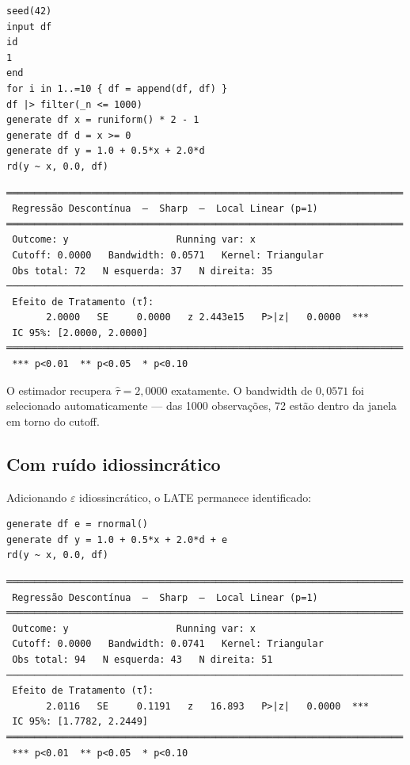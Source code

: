 \begin{lstlisting}[caption={DGP RDD sem ruído — recuperação exata}]
seed(42)
input df
id
1
end
for i in 1..=10 { df = append(df, df) }
df |> filter(_n <= 1000)
generate df x = runiform() * 2 - 1
generate df d = x >= 0
generate df y = 1.0 + 0.5*x + 2.0*d
rd(y ~ x, 0.0, df)
\end{lstlisting}

\begin{lstlisting}[language={}, basicstyle=\ttfamily\small,
  frame=none, numbers=none, backgroundcolor=\color{codbg},
  xleftmargin=0pt, xrightmargin=0pt, breaklines=false]
══════════════════════════════════════════════════════════════════════
 Regressão Descontínua  —  Sharp  —  Local Linear (p=1)
══════════════════════════════════════════════════════════════════════
 Outcome: y                   Running var: x
 Cutoff: 0.0000   Bandwidth: 0.0571   Kernel: Triangular
 Obs total: 72   N esquerda: 37   N direita: 35
──────────────────────────────────────────────────────────────────────
 Efeito de Tratamento (τ̂):
       2.0000   SE     0.0000   z 2.443e15   P>|z|   0.0000  ***
 IC 95%: [2.0000, 2.0000]
══════════════════════════════════════════════════════════════════════
 *** p<0.01  ** p<0.05  * p<0.10
\end{lstlisting}

O estimador recupera $\hat\tau = 2{,}0000$ exatamente. O bandwidth de
$0{,}0571$ foi selecionado automaticamente — das 1000 observações, 72 estão
dentro da janela em torno do cutoff.

\subsection*{Com ruído idiossincrático}

Adicionando $\varepsilon$ idiossincrático, o LATE permanece identificado:

\begin{lstlisting}[caption={DGP RDD com ruído}]
generate df e = rnormal()
generate df y = 1.0 + 0.5*x + 2.0*d + e
rd(y ~ x, 0.0, df)
\end{lstlisting}

\begin{lstlisting}[language={}, basicstyle=\ttfamily\small,
  frame=none, numbers=none, backgroundcolor=\color{codbg},
  xleftmargin=0pt, xrightmargin=0pt, breaklines=false]
══════════════════════════════════════════════════════════════════════
 Regressão Descontínua  —  Sharp  —  Local Linear (p=1)
══════════════════════════════════════════════════════════════════════
 Outcome: y                   Running var: x
 Cutoff: 0.0000   Bandwidth: 0.0741   Kernel: Triangular
 Obs total: 94   N esquerda: 43   N direita: 51
──────────────────────────────────────────────────────────────────────
 Efeito de Tratamento (τ̂):
       2.0116   SE     0.1191   z   16.893   P>|z|   0.0000  ***
 IC 95%: [1.7782, 2.2449]
══════════════════════════════════════════════════════════════════════
 *** p<0.01  ** p<0.05  * p<0.10
\end{lstlisting}

